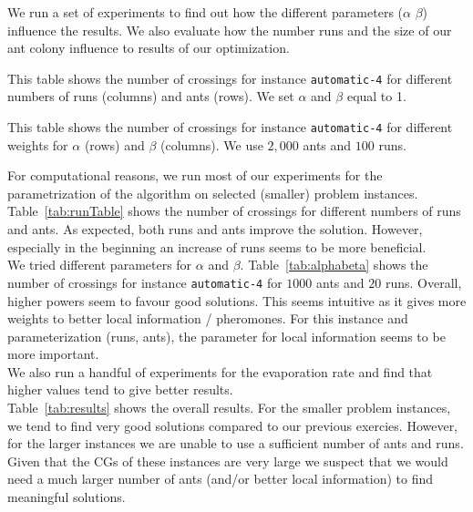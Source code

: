 \documentclass{scrartcl}
\begin{document}
We run a set of experiments to find out how the different parameters
($\alpha$ $\beta$) influence the results. We also evaluate how the
number runs and the size of our ant colony influence to results of our
optimization. \\


\begin{table}[!H]
\centering
\scriptsize  

\caption{This table shows the number of crossings for instance \texttt{automatic-4} for
different numbers of runs (columns) and ants (rows). We set $\alpha$ and $\beta$ equal to 1.}
\label{tab:runTable}
\end{table}


\begin{table}[!H]
\centering
\scriptsize  

\caption{This table shows the number of crossings for instance \texttt{automatic-4} for
different weights for $\alpha$ (rows) and $\beta$ (columns). We use $2,000$ ants and $100$ runs.}
\label{tab:alphabeta}
\end{table}


For computational reasons, we run most of our experiments for the parametrization of
the algorithm on selected
(smaller) problem instances. Table~\ref{tab:runTable} shows the number
of crossings for different numbers of runs and ants. As expected, both
runs and ants improve the solution. However, especially in the
beginning an increase of runs seems to be more beneficial.\\

We tried different parameters for $\alpha$ and
$\beta$. Table~\ref{tab:alphabeta} shows the number of crossings for
instance \texttt{automatic-4} for $1000$ ants and $20$ runs.  Overall,
higher powers seem to favour good solutions. This seems intuitive as
it gives more weights to better local information / pheromones. For
this instance and parameterization (runs, ants), the parameter for
local information seems to be more important. \\

We also run a handful of experiments for the evaporation rate and find that
higher values tend to give better results.\\

Table~\ref{tab:results} shows the overall results. For the smaller
problem instances, we tend to find very good solutions compared to our
previous exercies. However, for the larger instances we are unable to
use a sufficient number of ants and runs. Given that the CGs of these
instances are very large we suspect that we would need a much larger
number of ants (and/or better local information) to find meaningful
solutions.\\
\end{document}
